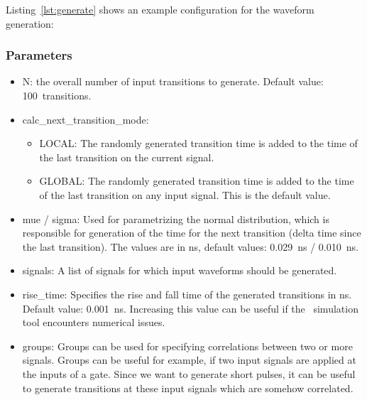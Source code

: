 Listing~\ref{lst:generate} shows an example configuration for the waveform
generation:


\subsubsection{Parameters}\label{sec:man-wave-param}

\begin{itemize}
\item
  N: the overall number of input transitions to generate. Default value: 
  \SI{100} transitions.
\item
  calc\_next\_transition\_mode:

  \begin{itemize}
  \item
    LOCAL: The randomly generated transition time is added to the time
    of the last transition on the current signal.
  \item
    GLOBAL: The randomly generated transition time is added to the time
    of the last transition on any input signal. This is the default value.
  \end{itemize}
\item
  mue / sigma: Used for parametrizing the normal distribution, which is
  responsible for generation of the time for the next transition (delta time
  since the last transition). The values are in \si{\ns}, default values: 
  \SI{0.029}{\ns} / \SI{0.010}{\ns}.
\item
  signals: A list of signals for which input waveforms should be
  generated.
  
\item rise\_time: Specifies the rise and fall time of the generated transitions 
in \si{\ns}. Default value: \SI{0.001}{\ns}. Increasing this value can be 
useful if the \spice\ simulation tool encounters numerical issues. 
  
\item
  groups: Groups can be used for specifying correlations between two or
  more signals. Groups can be useful for example, if two input signals are applied
  at the inputs of a gate. Since we want to generate short pulses, it
  can be useful to generate transitions at these input signals which are
  somehow correlated.


\end{itemize}
